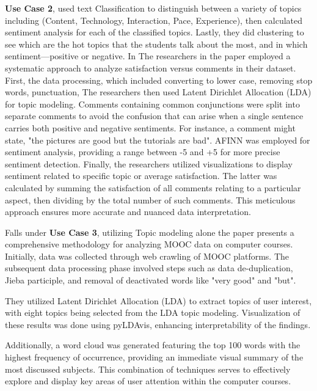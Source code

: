 \documentclass{svproc}
\begin{document}
\textbf{Use Case 2}, \cite{Analyzing_educational_comments_for_topics_and_sentiments:_A_text_analytics_approach} used text Classification to distinguish between a variety of topics including (Content, Technology, Interaction, Pace, Experience), then calculated sentiment analysis for each of the classified topics. Lastly, they did clustering to see which are the hot topics that the students talk about the most, and in which sentiment—positive or negative. In \cite{Visualizing_Student_Opinion_Through_Text_Analysis} The researchers in the paper employed a systematic approach to analyze satisfaction versus comments in their dataset. First, the data processing, which included converting to lower case, removing stop words, punctuation, The researchers then used Latent Dirichlet Allocation (LDA) for topic modeling.
Comments containing common conjunctions were split into separate comments to avoid the confusion that can arise when a single sentence carries both positive and negative sentiments. For instance, a comment might state, "the pictures are good but the tutorials are bad".
AFINN was employed for sentiment analysis, providing a range between -5 and +5 for more precise sentiment detection. Finally, the researchers utilized visualizations to display sentiment related to specific topic or average satisfaction. The latter was calculated by summing the satisfaction of all comments relating to a particular aspect, then dividing by the total number of such comments. This meticulous approach ensures more accurate and nuanced data interpretation.


Falls under \textbf{Use Case 3}, utilizing Topic modeling alone the paper \cite{A_Study_of_MOOC_Course_Review_Topics_Mining_Based_on_LDA_Topic_Model} presents a comprehensive methodology for analyzing MOOC data on computer courses. Initially, data was collected through web crawling of MOOC platforms. The subsequent data processing phase involved steps such as data de-duplication, Jieba participle, and removal of deactivated words like "very good" and "but".

They utilized Latent Dirichlet Allocation (LDA) to extract topics of user interest, with eight topics being selected from the LDA topic modeling. Visualization of these results was done using pyLDAvis, enhancing interpretability of the findings.

Additionally, a word cloud was generated featuring the top 100 words with the highest frequency of occurrence, providing an immediate visual summary of the most discussed subjects. This combination of techniques serves to effectively explore and display key areas of user attention within the computer courses.
\end{document}
